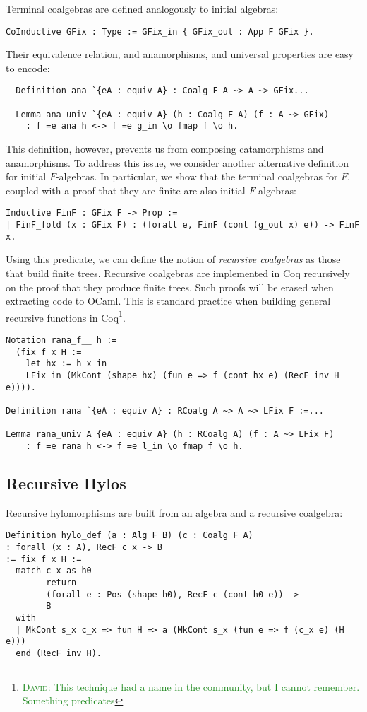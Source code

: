 \documentclass[a4paper, UKenglish, cleveref, autoref, thm-restate]{lipics-v2021}
\newcommand{\dcas}[1]{\textcolor{ForestGreen}{\textsc{David}: #1}}
\begin{document}
Terminal coalgebras are defined analogously to initial algebras:
\begin{verbatim}
CoInductive GFix : Type := GFix_in { GFix_out : App F GFix }.
\end{verbatim}
Their equivalence relation, and anamorphisms, and universal properties are
easy to encode:
\begin{verbatim}
  Definition ana `{eA : equiv A} : Coalg F A ~> A ~> GFix...

  Lemma ana_univ `{eA : equiv A} (h : Coalg F A) (f : A ~> GFix)
    : f =e ana h <-> f =e g_in \o fmap f \o h.
\end{verbatim}
This definition, however, prevents us from composing catamorphisms and
anamorphisms. To address this issue, we consider another alternative definition
for initial $F$-algebras. In particular, we show that the terminal coalgebras
for $F$, coupled with a proof that they are finite are also initial
$F$-algebras:
\begin{verbatim}
Inductive FinF : GFix F -> Prop :=
| FinF_fold (x : GFix F) : (forall e, FinF (cont (g_out x) e)) -> FinF x.
\end{verbatim}
Using this predicate, we can define the notion of \emph{recursive coalgebras}
as those that build finite trees. Recursive coalgebras are implemented in Coq
recursively on the proof that they produce finite trees.  Such proofs will be
erased when extracting code to OCaml. This is standard practice when building
general recursive functions in Coq\footnote{\dcas{This technique had a name in
the community, but I cannot remember. Something predicates}}.
\begin{verbatim}
Notation rana_f__ h :=
  (fix f x H :=
    let hx := h x in
    LFix_in (MkCont (shape hx) (fun e => f (cont hx e) (RecF_inv H e)))).

Definition rana `{eA : equiv A} : RCoalg A ~> A ~> LFix F :=...

Lemma rana_univ A {eA : equiv A} (h : RCoalg A) (f : A ~> LFix F)
    : f =e rana h <-> f =e l_in \o fmap f \o h.
\end{verbatim}

\subsection{Recursive Hylos}

Recursive hylomorphisms are built from an algebra and a recursive coalgebra:
\begin{verbatim}
Definition hylo_def (a : Alg F B) (c : Coalg F A)
: forall (x : A), RecF c x -> B
:= fix f x H :=
  match c x as h0
        return
        (forall e : Pos (shape h0), RecF c (cont h0 e)) ->
        B
  with
  | MkCont s_x c_x => fun H => a (MkCont s_x (fun e => f (c_x e) (H e)))
  end (RecF_inv H).
\end{verbatim}
\end{document}
